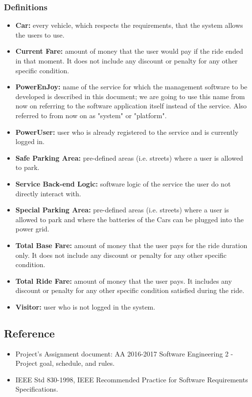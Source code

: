 \subsubsection{Definitions}
\begin{itemize}
\item \textbf{Car:} every vehicle, which respects the requirements, that the system allows the users to use.
\item \textbf{Current Fare:} amount of money that the user would pay if the ride ended in that moment. It does not include any discount or penalty for any other specific condition.
\item \textbf{PowerEnJoy:} name of the service for which the management software to be developed is described in this document; we are going to use this name from now on referring to the software application itself instead of the service. Also referred to from now on as "system" or "platform".
\item \textbf{PowerUser:} user who is already registered to the service and is currently logged in.
\item \textbf{Safe Parking Area:} pre-defined areas (i.e. streets) where a user is allowed to park.
\item \textbf{Service Back-end Logic:} software logic of the service the user do not directly interact with. 
\item \textbf{Special Parking Area:}  pre-defined areas (i.e. streets) where a user is allowed to park and where the batteries of the Cars can be plugged into the power grid.
\item \textbf{Total Base Fare:} amount of money that the user pays for the ride duration only. It does not include any discount or penalty for any other specific condition.
\item \textbf{Total Ride Fare:} amount of money that the user pays. It includes any discount or penalty for any other specific condition satisfied during the ride.
\item \textbf{Visitor:} user who is not logged in the system.
\end{itemize}
\subsection{Reference}
\begin{itemize}
\item Project's Assignment document: AA 2016-2017 Software Engineering 2 - Project goal, schedule, and rules.
\item IEEE Std 830-1998, IEEE Recommended Practice for Software Requirements Specifications.
\end{itemize}
